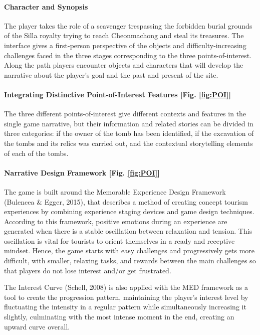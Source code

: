 \documentclass[runningheads]{llncs}
\begin{document}
\paragraph{Character and Synopsis} The player takes the role of a scavenger trespassing the forbidden burial grounds of the Silla royalty trying to reach Cheonmachong and steal its treasures. The interface gives a first-person perspective of the objects and difficulty-increasing challenges faced in the three stages corresponding to the three points-of-interest. Along the path players encounter objects and characters that will develop the narrative about the player's goal and the past and present of the site.
\paragraph{Integrating Distinctive Point-of-Interest Features [Fig. \ref{fig:POI}]} The three different points-of-interest give different contexts and features in the single game narrative, but their information and related stories can be divided in three categories: if the owner of the tomb has been identified, if the excavation of the tombs and its relics was carried out, and the contextual storytelling elements of each of the tombs.

\paragraph{Narrative Design Framework [Fig. \ref{fig:POI}]} The game is built around the Memorable Experience Design Framework (Bulencea \& Egger, 2015), that describes a method of creating concept tourism experiences by combining experience staging devices and game design techniques. According to this framework, positive emotions during an experience are generated when there is a stable oscillation between relaxation and tension. This oscillation is vital for tourists to orient themselves in a ready and receptive mindset. Hence, the game starts with easy challenges and progressively gets more difficult, with smaller, relaxing tasks, and rewards between the main challenges so that players do not lose interest and/or get frustrated.
\par The Interest Curve (Schell, 2008) is also applied with the MED framework as a tool to create the progression pattern, maintaining the player's interest level by fluctuating the intensity in a regular pattern while simultaneously increasing it slightly, culminating with the most intense moment in the end, creating an upward curve overall.
\end{document}
